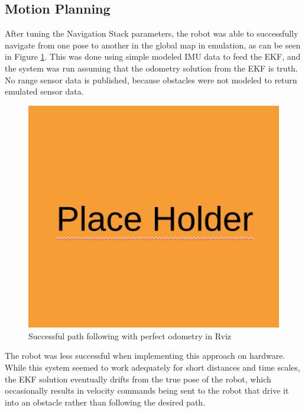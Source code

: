 \subsection{ Motion Planning }

After tuning the Navigation Stack parameters, the robot was able to successfully navigate from one pose to another in the global map in emulation, as can be seen in Figure \ref{fig:sim_path_following}. This was done using simple modeled IMU data to feed the EKF, and the system was run assuming that the odometry solution from the EKF is truth. No range sensor data is published, because obstacles were not modeled to return emulated sensor data. 

\begin{figure}[H]
    \centerline{\includegraphics[scale=0.25]{place_holder.png}}
    \caption{Successful path following with perfect odometry in Rviz}
    \label{fig:sim_path_following}
\end{figure}

The robot was less successful when implementing this approach on hardware. While this system seemed to work adequately for short distances and time scales, the EKF solution eventually drifts from the true pose of the robot, which occasionally results in velocity commands being sent to the robot that drive it into an obstacle rather than following the desired path. 

